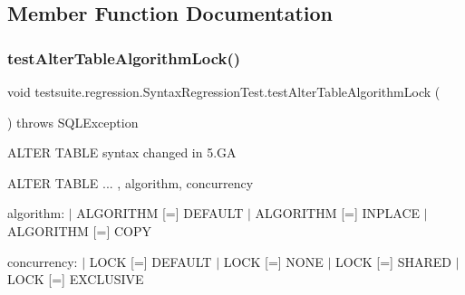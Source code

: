 \subsection{Member Function Documentation}
\mbox{\label{classtestsuite_1_1regression_1_1_syntax_regression_test_ad8db7c4293c435d564218db929d2d30d}} 
\subsubsection{\texorpdfstring{test\+Alter\+Table\+Algorithm\+Lock()}{testAlterTableAlgorithmLock()}}
{\footnotesize\ttfamily void testsuite.\+regression.\+Syntax\+Regression\+Test.\+test\+Alter\+Table\+Algorithm\+Lock (\begin{DoxyParamCaption}{ }\end{DoxyParamCaption}) throws S\+Q\+L\+Exception}

A\+L\+T\+ER T\+A\+B\+LE syntax changed in 5.\+GA

A\+L\+T\+ER T\+A\+B\+LE ... , algorithm, concurrency

algorithm\+: $\vert$ A\+L\+G\+O\+R\+I\+T\+HM \mbox{[}=\mbox{]} D\+E\+F\+A\+U\+LT $\vert$ A\+L\+G\+O\+R\+I\+T\+HM \mbox{[}=\mbox{]} I\+N\+P\+L\+A\+CE $\vert$ A\+L\+G\+O\+R\+I\+T\+HM \mbox{[}=\mbox{]} C\+O\+PY

concurrency\+: $\vert$ L\+O\+CK \mbox{[}=\mbox{]} D\+E\+F\+A\+U\+LT $\vert$ L\+O\+CK \mbox{[}=\mbox{]} N\+O\+NE $\vert$ L\+O\+CK \mbox{[}=\mbox{]} S\+H\+A\+R\+ED $\vert$ L\+O\+CK \mbox{[}=\mbox{]} E\+X\+C\+L\+U\+S\+I\+VE


